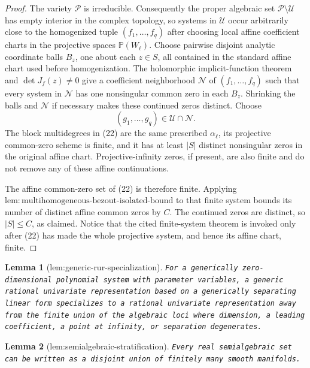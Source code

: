 \documentclass{article}
\newtheorem{lemma}{Lemma}
\begin{document}
\begin{proof}
The variety \(\mathcal P\) is irreducible. Consequently the proper algebraic set \(\mathcal P\setminus\mathcal U\) has empty interior in the complex topology, so systems in \(\mathcal U\) occur arbitrarily close to the homogenized tuple \((f_1,\ldots,f_q)\) after choosing local affine coefficient charts in the projective spaces \(\mathbb P(W_\ell)\). Choose pairwise disjoint analytic coordinate balls \(B_z\), one about each \(z\in S\), all contained in the standard affine chart used before homogenization. The holomorphic implicit-function theorem and \(\det J_f(z)\ne0\) give a coefficient neighborhood \(\mathcal N\) of \((f_1,\ldots,f_q)\) such that every system in \(\mathcal N\) has one nonsingular common zero in each \(B_z\). Shrinking the balls and \(\mathcal N\) if necessary makes these continued zeros distinct. Choose
\[
 (g_1,\ldots,g_q)\in\mathcal U\cap\mathcal N.
\tag{22}
\]
The block multidegrees in (22) are the same prescribed \(\alpha_\ell\), its projective common-zero scheme is finite, and it has at least \(|S|\) distinct nonsingular zeros in the original affine chart. Projective-infinity zeros, if present, are also finite and do not remove any of these affine continuations.

The affine common-zero set of (22) is therefore finite. Applying \(\mathrm{lem:multihomogeneous\mbox{-}bezout\mbox{-}isolated\mbox{-}bound}\) to that finite system bounds its number of distinct affine common zeros by \(C\). The continued zeros are distinct, so \(|S|\leq C\), as claimed. Notice that the cited finite-system theorem is invoked only after (22) has made the whole projective system, and hence its affine chart, finite.
\end{proof}

\begin{lemma}[lem:generic-rur-specialization]\label{lem:generic-rur-specialization}
\texttt{For a generically zero-\allowbreak{}dimensional polynomial system with parameter variables,\allowbreak{} a generic rational univariate representation based on a generically separating linear form specializes to a rational univariate representation away from the finite union of the algebraic loci where dimension,\allowbreak{} a leading coefficient,\allowbreak{} a point at infinity,\allowbreak{} or separation degenerates.}
\end{lemma}

\begin{lemma}[lem:semialgebraic-stratification]\label{lem:semialgebraic-stratification}
\texttt{Every real semialgebraic set can be written as a disjoint union of finitely many smooth manifolds.}
\end{lemma}
\end{document}
